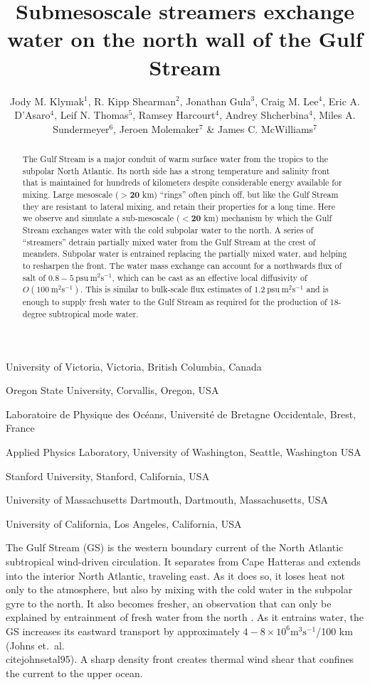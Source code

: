 \documentclass{natureJMK}
\title{Submesoscale streamers exchange water on the north wall of the Gulf Stream}
\author{Jody M. Klymak$^{1}$, R. Kipp Shearman$^2$, Jonathan Gula$^3$, Craig M. Lee$^4$, Eric A. D'Asaro$^4$, Leif N. Thomas$^5$, Ramsey Harcourt$^4$, Andrey Shcherbina$^4$, Miles A. Sundermeyer$^6$, Jeroen Molemaker$^7$ \& James C. McWilliams$^7$}
\begin{document}
\maketitle

\begin{affiliations}
 \item University of Victoria, Victoria, British Columbia, Canada
 \item Oregon State University, Corvallis, Oregon, USA
 \item Laboratoire de Physique des Oc\'eans, Universit\'e de Bretagne Occidentale, Brest, France
 \item Applied Physics Laboratory, University of Washington, Seattle, Washington USA
 \item Stanford University, Stanford, California, USA
 \item University of Massachusetts Dartmouth, Dartmouth, Massachusetts, USA
 \item University of California, Los Angeles, California, USA 
\end{affiliations}

\begin{abstract}
The Gulf Stream is a major conduit of warm surface water from the tropics to the subpolar North Atlantic.  Its north side has a strong  temperature and salinity front that is maintained for hundreds of kilometers despite considerable energy available for mixing.  Large mesoscale ($\mathbf{>20}$ km) ``rings'' often pinch off, but like the Gulf Stream they are resistant to lateral mixing, and retain their properties for a long time.  Here we observe and simulate a sub-mesoscale ($\mathbf{<20}$ km) mechanism by which the Gulf Stream exchanges water with the cold subpolar water to the north. A series of ``streamers'' detrain partially mixed water from the Gulf Stream at the crest of meanders. Subpolar water is entrained replacing the partially mixed water, and helping to resharpen the front. The water mass exchange can account for a northwards flux of salt of $0.8-5\ \mathrm{psu\ m^2s^{-1}}$, which can be cast as an effective local diffusivity of $O(100\ \mathrm{m^2s^{-1}})$. This  is similar to bulk-scale flux estimates of $1.2\ \mathrm{psu\ m^2s^{-1}}$ and is enough to supply  fresh water to the Gulf Stream as required for the production of 18-degree subtropical mode water. 
\end{abstract}

The Gulf Stream (GS) is the western boundary current of the North Atlantic subtropical wind-driven circulation.  It separates from Cape Hatteras and extends into the interior North Atlantic, traveling east.  As it does so, it loses heat not only to  the atmosphere, but also by mixing with the cold water in the subpolar gyre to the north.  It also becomes fresher, an observation that can only be explained by entrainment of fresh water from the north \cite{joyceetal13}.  As it entrains water, the GS  increases its eastward transport by approximately $4-8\times 10^6 \mathrm{m^3s^{-1}}$/100 km (Johns et.\ al.\\cite{johnsetal95}).   A sharp density front creates thermal wind shear that confines the current to the upper ocean.  
\end{document}
